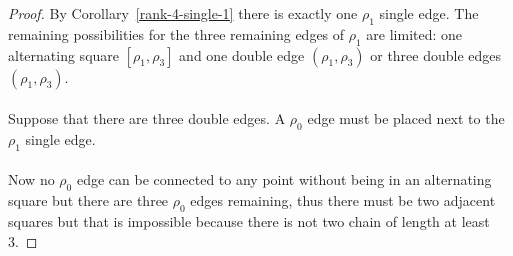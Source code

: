 \begin{proof}
  By Corollary~\ref{rank-4-single-1} there is exactly one $\rho_1$ single edge. The remaining possibilities for the three remaining edges of $\rho_1$ are limited: one alternating square $[\rho_1, \rho_3]$ and one double edge $(\rho_1, \rho_3)$ or three double edges $(\rho_1, \rho_3)$.

  \paragraph{}
  Suppose that there are three double edges. A $\rho_0$ edge must be placed next to the $\rho_1$ single edge.

    \begin{figure}[H]
      \begin{center}
        \caption{}
      \end{center}
    \end{figure}

  \paragraph{}
  Now no $\rho_0$ edge can be connected to any point without being in an alternating square but there are three $\rho_0$ edges remaining, thus there must be two adjacent squares but that is impossible because there is not two chain of length at least 3. 
\end{proof}
